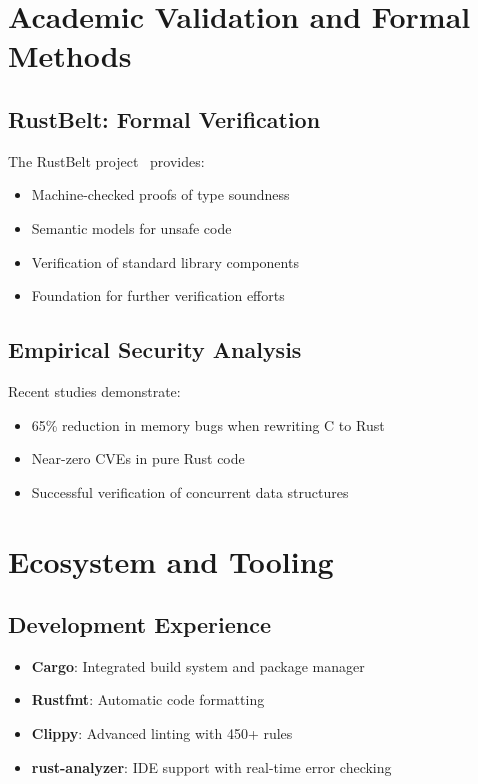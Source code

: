 \documentclass[11pt]{article}
\begin{document}
\section{Academic Validation and Formal Methods}

\subsection{RustBelt: Formal Verification}

The RustBelt project~\cite{jung2018rustbelt} provides:
\begin{itemize}
    \item Machine-checked proofs of type soundness
    \item Semantic models for unsafe code
    \item Verification of standard library components
    \item Foundation for further verification efforts
\end{itemize}

\subsection{Empirical Security Analysis}

Recent studies demonstrate:
\begin{itemize}
    \item 65\% reduction in memory bugs when rewriting C to Rust~\cite{acsac2022rust}
    \item Near-zero CVEs in pure Rust code~\cite{cveanalysis2023}
    \item Successful verification of concurrent data structures~\cite{verus2023}
\end{itemize}

\section{Ecosystem and Tooling}

\subsection{Development Experience}
\begin{itemize}
    \item \textbf{Cargo}: Integrated build system and package manager
    \item \textbf{Rustfmt}: Automatic code formatting
    \item \textbf{Clippy}: Advanced linting with 450+ rules
    \item \textbf{rust-analyzer}: IDE support with real-time error checking
\end{itemize}
\end{document}
